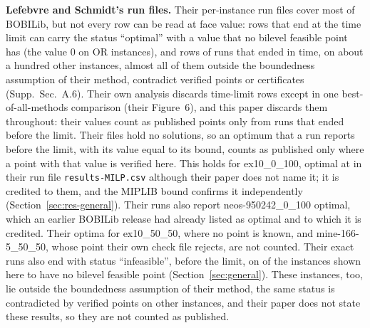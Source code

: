 \documentclass[]{spie}  %
\theoremstyle{plain}
\newcommand{\supp}[1]{Supp.\ Sec.~#1}
\newcommand{\code}[1]{\texttt{#1}}
\newcommand{\inst}[1]{\mbox{#1}}             %
\begin{document}
\textbf{Lefebvre and Schmidt's run files.} Their per-instance run files cover most of BOBILib,
but not every row can be read at face value: rows that end at the time limit can carry the status
``optimal'' with a value that no bilevel feasible point has (the value 0 on \LsOrZeroOptimal{} OR
instances), and rows of runs that ended in time, on about a hundred other instances, almost all of
them outside the boundedness assumption of their method, contradict verified points or
certificates (\supp{A.6}). Their own analysis discards time-limit rows except in one
best-of-all-methods comparison (their Figure~6), and this paper discards them throughout: their
values count as published points only from runs that ended before the limit. Their files hold no
solutions, so an optimum that a run reports before the limit, with its value equal to its bound,
counts as published only where a point with that value is verified here. This holds for
\inst{ex10\_0\_100}, optimal at \ExTenOptimum{} in their run file \code{results-MILP.csv}
although their paper does not name it; it is credited to them, and the MIPLIB bound confirms it
independently (Section~\ref{sec:res-general}). Their runs also report \inst{neos-950242\_0\_100}
optimal, which an earlier BOBILib release had already listed as optimal and to which it is
credited. Their optima for
\inst{ex10\_50\_50}, where no point is known, and \inst{mine-166-5\_50\_50}, whose point their
own check file rejects, are not counted. Their exact runs also end with status ``infeasible'', before the limit, on
\LsInfeasibleNoFeasible{} of the \NumNoFeasible{} instances shown here to have no bilevel feasible
point (Section~\ref{sec:general}). These instances, too, lie outside the boundedness assumption of
their method, the same status is contradicted by verified points on \LsInfeasibleVerifiedPoint{}
other instances, and their paper does not state these results, so they are not counted as
published.
\end{document}
